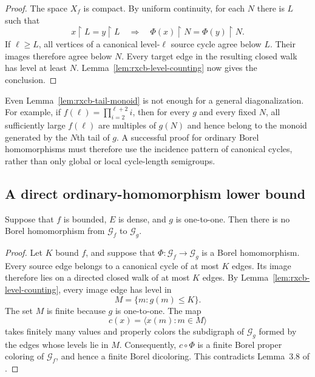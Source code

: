 \begin{proof}
The space $X_f$ is compact.  By uniform continuity, for each $N$ there
is $L$ such that
\[
  x\mathbin{\upharpoonright}L=y\mathbin{\upharpoonright}L
  \quad\Longrightarrow\quad
  \Phi(x)\mathbin{\upharpoonright}N
   =\Phi(y)\mathbin{\upharpoonright}N.
\]
If $\ell\geq L$, all vertices of a canonical level-$\ell$ source
cycle agree below $L$.  Their images therefore agree below $N$.
Every target edge in the resulting closed walk has level at least
$N$.  Lemma~\ref{lem:rxcb-level-counting} now gives the conclusion.
\end{proof}

Even Lemma~\ref{lem:rxcb-tail-monoid} is not enough for a general
diagonalization.  For example, if $f(\ell)=\prod_{i=2}^{\ell+2}i$, then for every
$g$ and every fixed $N$, all sufficiently large $f(\ell)$ are
multiples of $g(N)$ and hence belong to the monoid generated by the
$N$th tail of $g$.  A successful proof for ordinary Borel
homomorphisms must therefore use the incidence pattern of canonical
cycles, rather than only global or local cycle-length semigroups.

\subsection{A direct ordinary-homomorphism lower bound}
\label{subsec:rxcb-bounded}

\begin{proposition}
\label{prop:rxcb-bounded-source}
Suppose that $f$ is bounded, $E$ is dense, and $g$ is one-to-one.
Then there is no Borel homomorphism from $\mathcal G_f$ to
$\mathcal G_g$.
\end{proposition}

\begin{proof}
Let $K$ bound $f$, and suppose that
$\Phi:\mathcal G_f\to\mathcal G_g$ is a Borel homomorphism.  Every
source edge belongs to a canonical cycle of at most $K$ edges.  Its
image therefore lies on a directed closed walk of at most $K$ edges.
By Lemma~\ref{lem:rxcb-level-counting}, every image edge has level in
\[
  M=\{m:g(m)\leq K\}.
\]
The set $M$ is finite because $g$ is one-to-one.  The map
\[
  c(x)=\langle x(m):m\in M\rangle
\]
takes finitely many values and properly colors the subdigraph of
$\mathcal G_g$ formed by the edges whose levels lie in $M$.
Consequently, $c\circ\Phi$ is a finite Borel proper coloring of
$\mathcal G_f$, and hence a finite Borel dicoloring.  This contradicts
Lemma~3.8 of \cite{RX24}.
\end{proof}

